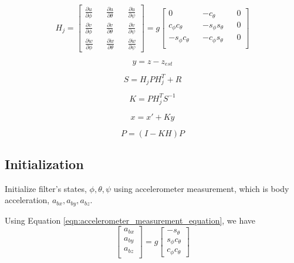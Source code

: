 \documentclass[]{article}
\begin{document}
\begin{equation}
	H_j = 
	\begin{bmatrix}
		\frac{\partial \dot{u}}{\partial \phi} && \frac{\partial \dot{u}}{\partial \theta} && \frac{\partial \dot{u}}{\partial \psi} \\
		\frac{\partial \dot{v}}{\partial \phi} && \frac{\partial \dot{v}}{\partial \theta} && \frac{\partial \dot{v}}{\partial \psi} \\
		\frac{\partial \dot{w}}{\partial \phi} && \frac{\partial \dot{w}}{\partial \theta} && \frac{\partial \dot{w}}{\partial \psi}
	\end{bmatrix} = g
	\begin{bmatrix}
		0 && -c_{\theta} && 0 \\
		c_{\phi}c_{\theta} && -s_{\phi}s_{\theta} && 0 \\
		-s_{\phi}c_{\theta} && -c_{\phi}s_{\theta} && 0 \\
	\end{bmatrix}
\end{equation}

\begin{equation}
	y = z - z_{est}\label{eqn:measurement_difference_2}
\end{equation}

\begin{equation}
	S = H_j P H_j^T + R\label{eqn:innovation_covariance_2}
\end{equation}

\begin{equation}
	K = P H_j^T S^{-1}\label{eqn:kalman_gain_2}
\end{equation}

\begin{equation}
	x = x' + Ky\label{eqn:updated_states_2}
\end{equation}

\begin{equation}
	P = (I-KH)P\label{eqn:updated_covariance_2}
\end{equation}


\subsection{Initialization}
Initialize filter's states, $\phi, \theta, \psi$ using accelerometer measurement, which is body acceleration, $a_{bx}, a_{by}, a_{bz}$.

Using Equation \ref{eqn:accelerometer_measurement_equation}, we have 
\begin{equation}
\begin{bmatrix}
a_{bx} \\
a_{by} \\
a_{bz} \\
\end{bmatrix} = g
\begin{bmatrix}
-s_\theta \\
s_\phi c_\theta \\
c_\phi c_\theta
\end{bmatrix}
\end{equation}
\end{document}
